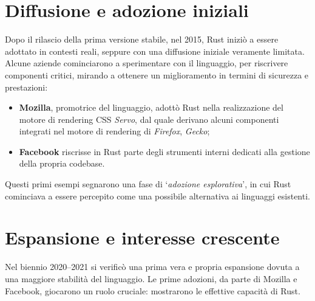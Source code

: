 \section{Diffusione e adozione iniziali}
Dopo il rilascio della prima versione stabile, nel 2015, Rust iniziò a essere adottato in contesti reali, seppure con una
diffusione iniziale veramente limitata. Alcune aziende cominciarono a sperimentare con il linguaggio, per riscrivere
componenti critici, mirando a ottenere un miglioramento in termini di sicurezza e prestazioni:
\begin{itemize}
    \item \textbf{Mozilla}, promotrice del linguaggio, adottò Rust nella realizzazione del motore di rendering CSS \textit{Servo}, dal quale derivano alcuni componenti integrati nel motore di rendering di \textit{Firefox}, \textit{Gecko};
    \item \textbf{Facebook} riscrisse in Rust parte degli strumenti interni dedicati alla gestione della propria codebase.
\end{itemize}
Questi primi esempi segnarono una fase di `\textit{adozione esplorativa}', in cui Rust cominciava a essere percepito come una 
possibile alternativa ai linguaggi esistenti.

\section{Espansione e interesse crescente}
Nel biennio 2020--2021 si verificò una prima vera e propria espansione dovuta a una maggiore stabilità del linguaggio. Le prime adozioni, 
da parte di Mozilla e Facebook, giocarono un ruolo cruciale: mostrarono le effettive capacità di Rust.

